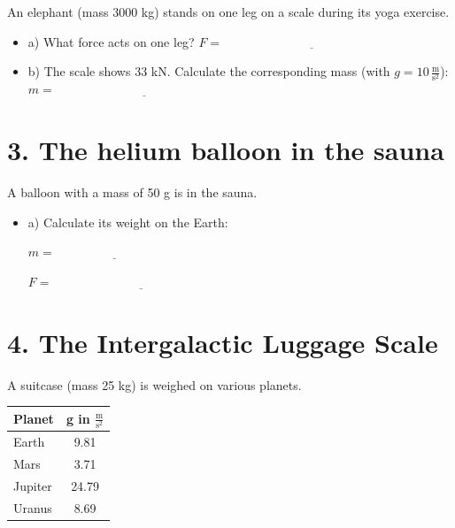\documentclass[a4paper,12pt]{article}
\begin{document}
	An elephant (mass 3000 kg) stands on one leg on a scale during its yoga exercise.
	
	\begin{itemize}
		\item a) What force acts on one leg?
		\( F = \underline{\hspace{6cm}} \)
		
		\item b) The scale shows 33 kN. Calculate the corresponding mass (with \( g = 10 \, \frac{\text{m}}{\text{s}^2} \)):\\
		
			\vspace{1em}
		\( m = \underline{\hspace{6cm}} \)
	\end{itemize}
	
	\hrulefill
	
	\section*{3. The helium balloon in the sauna }
	
	A balloon with a mass of 50 g is in the sauna.
	
	\begin{itemize}
		\item a) Calculate its weight on the Earth:
		
		\vspace{1em}
		\( m = \underline{\hspace{4cm}} \)
		
		\( F = \underline{\hspace{6cm}} \)
	\end{itemize}
	
	\hrulefill
	
	\section*{4. The Intergalactic Luggage Scale}
		
		A suitcase (mass 25 kg) is weighed on various planets.
		
		\begin{center}
			\begin{tabular}{l c}
				\toprule
				\textbf{Planet} & \textbf{g in } \( \frac{\text{m}}{\text{s}^2} \) \\
				\midrule
				Earth & 9.81 \\
				Mars & 3.71 \\
				Jupiter & 24.79 \\
				Uranus & 8.69 \\
				\bottomrule
			\end{tabular}
		\end{center}
		
\end{document}
